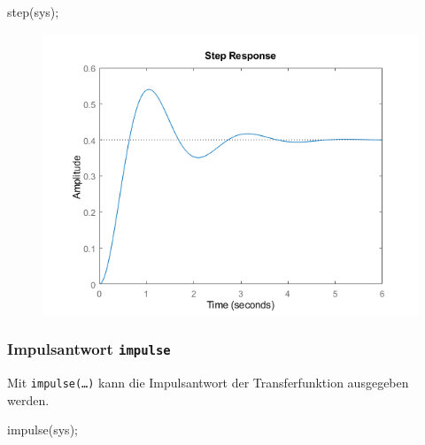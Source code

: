 \documentclass[
  10pt,
  a4paper,
]{article}
\newenvironment{Shaded}{}{}
\newcommand{\NormalTok}[1]{\textcolor[rgb]{0.14,0.16,0.18}{#1}}
\newcommand{\OperatorTok}[1]{\textcolor[rgb]{0.14,0.16,0.18}{#1}}
\newcommand{\VariableTok}[1]{\textcolor[rgb]{0.89,0.38,0.04}{#1}}
\numberwithin{equation}{section}
\begin{document}
\begin{multicols}{2}
\begin{Shaded}
\begin{Highlighting}[]
\VariableTok{step}\NormalTok{(}\VariableTok{sys}\NormalTok{)}\OperatorTok{;}
\end{Highlighting}
\end{Shaded}

\begin{figure}[H]

{\centering \includegraphics{images/matlab_StepResponsePlot.png}

}

\end{figure}

\hypertarget{impulsantwort-impulse}{%
\subsubsection{\texorpdfstring{Impulsantwort
\texttt{impulse}}{Impulsantwort impulse}}\label{impulsantwort-impulse}}

Mit \texttt{impulse(…)} kann die Impulsantwort der Transferfunktion
ausgegeben werden.

\begin{Shaded}
\begin{Highlighting}[]
\VariableTok{impulse}\NormalTok{(}\VariableTok{sys}\NormalTok{)}\OperatorTok{;}
\end{Highlighting}
\end{Shaded}

\begin{figure}[H]


\end{figure}
\end{multicols}
\end{document}
